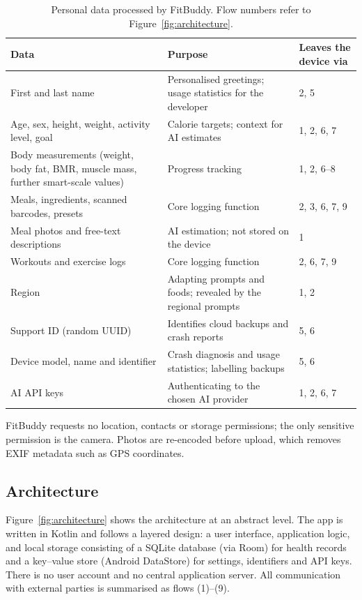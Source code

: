 \begin{table}[htbp]
\centering
\footnotesize
\caption{Personal data processed by FitBuddy. Flow numbers refer to Figure~\ref{fig:architecture}.}
\label{tab:data}
\begin{tabularx}{\textwidth}{@{}L L l@{}}
\toprule
\textbf{Data} & \textbf{Purpose} & \textbf{Leaves the device via} \\
\midrule
First and last name & Personalised greetings; usage statistics for the developer & 2, 5 \\
Age, sex, height, weight, activity level, goal & Calorie targets; context for AI estimates & 1, 2, 6, 7 \\
Body measurements (weight, body fat, BMR, muscle mass, further smart-scale values) & Progress
  tracking & 1, 2, 6--8 \\
Meals, ingredients, scanned barcodes, presets & Core logging function & 2, 3, 6, 7, 9 \\
Meal photos and free-text descriptions & AI estimation; not stored on the device & 1 \\
Workouts and exercise logs & Core logging function & 2, 6, 7, 9 \\
Region & Adapting prompts and foods; revealed by the regional prompts & 1, 2 \\
Support ID (random UUID) & Identifies cloud backups and crash reports & 5, 6 \\
Device model, name and identifier & Crash diagnosis and usage statistics; labelling backups & 5, 6 \\
AI API keys & Authenticating to the chosen AI provider & 1, 2, 6, 7 \\
\bottomrule
\end{tabularx}
\end{table}

FitBuddy requests no location, contacts or storage permissions; the only sensitive permission is
the camera. Photos are re-encoded before upload, which removes EXIF metadata such as GPS
coordinates.

\subsection{Architecture}
Figure~\ref{fig:architecture} shows the architecture at an abstract level. The app is written in
Kotlin and follows a layered design: a user interface, application logic, and local storage
consisting of a SQLite database (via Room) for health records and a key--value store (Android
DataStore) for settings, identifiers and API keys. There is no user account and no central
application server. All communication with external parties is summarised as flows (1)--(9).

